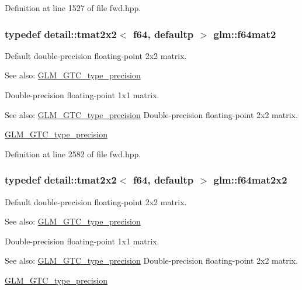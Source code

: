 Definition at line 1527 of file fwd.hpp.\hypertarget{group__gtc__type__precision_ga66040c1fd82a9d1f6ac82d4e1e8baa6}{
\subsubsection[f64mat2]{\setlength{\rightskip}{0pt plus 5cm}typedef detail::tmat2x2$<$ f64, defaultp $>$ {\bf glm::f64mat2}}}
\label{group__gtc__type__precision_ga66040c1fd82a9d1f6ac82d4e1e8baa6}


Default double-precision floating-point 2x2 matrix. \begin{Desc}
\item[See also:]\hyperlink{group__gtc__type__precision}{GLM\_\-GTC\_\-type\_\-precision}\end{Desc}
Double-precision floating-point 1x1 matrix. \begin{Desc}
\item[See also:]\hyperlink{group__gtc__type__precision}{GLM\_\-GTC\_\-type\_\-precision} Double-precision floating-point 2x2 matrix. 

\hyperlink{group__gtc__type__precision}{GLM\_\-GTC\_\-type\_\-precision} \end{Desc}


Definition at line 2582 of file fwd.hpp.\hypertarget{group__gtc__type__precision_gd125d405392e76f26f359798350fb64f}{
\subsubsection[f64mat2x2]{\setlength{\rightskip}{0pt plus 5cm}typedef detail::tmat2x2$<$ f64, defaultp $>$ {\bf glm::f64mat2x2}}}
\label{group__gtc__type__precision_gd125d405392e76f26f359798350fb64f}


Default double-precision floating-point 2x2 matrix. \begin{Desc}
\item[See also:]\hyperlink{group__gtc__type__precision}{GLM\_\-GTC\_\-type\_\-precision}\end{Desc}
Double-precision floating-point 1x1 matrix. \begin{Desc}
\item[See also:]\hyperlink{group__gtc__type__precision}{GLM\_\-GTC\_\-type\_\-precision} Double-precision floating-point 2x2 matrix. 

\hyperlink{group__gtc__type__precision}{GLM\_\-GTC\_\-type\_\-precision} \end{Desc}


